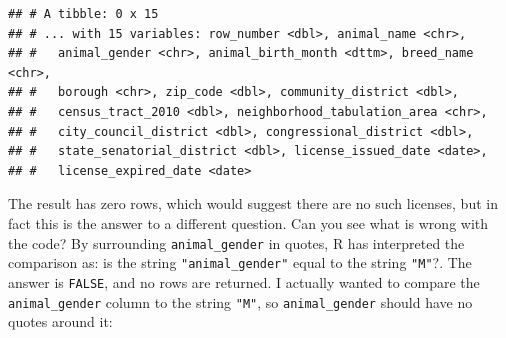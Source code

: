\documentclass[]{Nemilov}
\newenvironment{Shaded}{\begin{snugshade}}{\end{snugshade}}
\newcommand{\KeywordTok}[1]{\textcolor[rgb]{0.13,0.29,0.53}{\textbf{#1}}}
\newcommand{\NormalTok}[1]{#1}
\newcommand{\OperatorTok}[1]{\textcolor[rgb]{0.81,0.36,0.00}{\textbf{#1}}}
\newcommand{\StringTok}[1]{\textcolor[rgb]{0.31,0.60,0.02}{#1}}
\begin{document}
\begin{Shaded}
\end{Shaded}

\begin{verbatim}
## # A tibble: 0 x 15
## # ... with 15 variables: row_number <dbl>, animal_name <chr>,
## #   animal_gender <chr>, animal_birth_month <dttm>, breed_name <chr>,
## #   borough <chr>, zip_code <dbl>, community_district <dbl>,
## #   census_tract_2010 <dbl>, neighborhood_tabulation_area <chr>,
## #   city_council_district <dbl>, congressional_district <dbl>,
## #   state_senatorial_district <dbl>, license_issued_date <date>,
## #   license_expired_date <date>
\end{verbatim}

The result has zero rows, which would suggest there are no such licenses, but in fact this is the answer to a different question. Can you see what is wrong with the code? By surrounding \texttt{animal\_gender} in quotes, R has interpreted the comparison as: is the string \texttt{"animal\_gender"} equal to the string \texttt{"M"}?. The answer is \texttt{FALSE}, and no rows are returned. I actually wanted to compare the \texttt{animal\_gender} column to the string \texttt{"M"}, so \texttt{animal\_gender} should have no quotes around it:

\begin{Shaded}
\end{Shaded}
\end{document}
